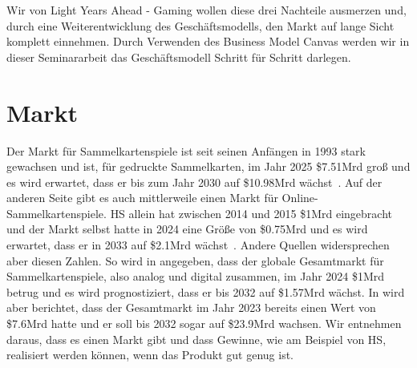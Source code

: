\documentclass[fontsize=11, a4aper]{scrartcl}
\begin{document}

\noindent Wir von Light Years Ahead - Gaming wollen diese drei Nachteile ausmerzen und, durch eine Weiterentwicklung des Geschäftsmodells, den Markt auf lange Sicht komplett einnehmen. Durch Verwenden des Business Model Canvas werden wir in dieser Seminararbeit das Geschäftsmodell Schritt für Schritt darlegen.  

\section{Markt} \label{sec:Markt}

Der Markt für Sammelkartenspiele ist seit seinen Anfängen in 1993 stark gewachsen und ist, für gedruckte Sammelkarten, im Jahr 2025 \$7.51Mrd groß und es wird erwartet, dass er bis zum Jahr 2030 auf \$10.98Mrd wächst~\cite{Print_TCG_Market_Size}. Auf der anderen Seite gibt es auch mittlerweile einen Markt für Online-Sammelkartenspiele. \ac{HS} allein hat zwischen 2014 und 2015 \$1Mrd eingebracht und der Markt selbst hatte in 2024 eine Größe von \$0.75Mrd und es wird erwartet, dass er in 2033 auf \$2.1Mrd wächst~\cite{Online_TCG_Market_Size}. Andere Quellen widersprechen aber diesen Zahlen. So wird in \cite{TCG_Market_Size_2024} angegeben, dass der globale Gesamtmarkt für Sammelkartenspiele, also analog und digital zusammen, im Jahr 2024 \$1Mrd betrug und es wird prognostiziert, dass er bis 2032 auf \$1.57Mrd wächst. In \cite{TCG_Market_Size} wird aber berichtet, dass der Gesamtmarkt im Jahr 2023 bereits einen Wert von \$7.6Mrd hatte und er soll bis 2032 sogar auf \$23.9Mrd wachsen. Wir entnehmen daraus, dass es einen Markt gibt und dass Gewinne, wie am Beispiel von \ac{HS}, realisiert werden können, wenn das Produkt gut genug ist.\hfill\newline

\end{document}
